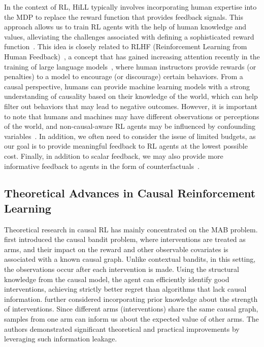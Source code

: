 \documentclass[10pt]{article} %
\theoremstyle{definition}
\begin{document}
In the context of RL, HiLL typically involves incorporating human expertise into the MDP to replace the reward function that provides feedback signals. This approach allows us to train RL agents with the help of human knowledge and values, alleviating the challenges associated with defining a sophisticated reward function~\citep{zhangCanHumansBe2022a}. This idea is closely related to RLHF (Reinforcement Learning from Human Feedback)~\citep{christianoDeepReinforcementLearning2017}, a concept that has gained increasing attention recently in the training of large language models~\citep{zieglerFineTuningLanguageModels2020, glaeseImprovingAlignmentDialogue2022, ouyangTrainingLanguageModels2022}, where human instructors provide rewards (or penalties) to a model to encourage (or discourage) certain behaviors. From a causal perspective, humans can provide machine learning models with a strong understanding of causality based on their knowledge of the world, which can help filter out behaviors that may lead to negative outcomes. However, it is important to note that humans and machines may have different observations or perceptions of the world, and non-causal-aware RL agents may be influenced by confounding variables~\citep{gasseUsingConfoundedData2023}. In addition, we often need to consider the issue of limited budgets, as our goal is to provide meaningful feedback to RL agents at the lowest possible cost. Finally, in addition to scalar feedback, we may also provide more informative feedback to agents in the form of counterfactuals~\citep{karalusAcceleratingLearningTAMER2022}.

\subsection{Theoretical Advances in Causal Reinforcement Learning}
\label{subsec:7.4theory}

Theoretical research in causal RL has mainly concentrated on the MAB problem. \citet{lattimoreCausalBanditsLearning2016a} first introduced the causal bandit problem, where interventions are treated as arms, and their impact on the reward and other observable covariates is associated with a known causal graph. Unlike contextual bandits, in this setting, the observations occur after each intervention is made. Using the structural knowledge from the causal model, the agent can efficiently identify good interventions, achieving strictly better regret than algorithms that lack causal information. 
\citet{senIdentifyingBestInterventions2017a} further considered incorporating prior knowledge about the strength of interventions. Since different arms (interventions) share the same causal graph, samples from one arm can inform us about the expected value of other arms. The authors demonstrated significant theoretical and practical improvements by leveraging such information leakage.
\end{document}
